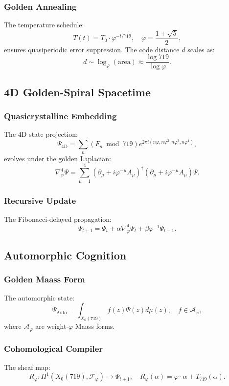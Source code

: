\documentclass[12pt]{article}
\begin{document}
\begin{center}
\subsubsection{Golden Annealing}
The temperature schedule:
\[
T(t) = T_0 \cdot \varphi^{-t/719}, \quad \varphi = \frac{1+\sqrt{5}}{2},
\]
ensures quasiperiodic error suppression. The code distance $d$ scales as:
\[
d \sim \log_\varphi(\text{area}) \approx \frac{\log 719}{\log \varphi}.
\]

\subsection{4D Golden-Spiral Spacetime}
\subsubsection{Quasicrystalline Embedding}
The 4D state projection:
\[
\Psi_{\text{4D}} = \sum_{n} (F_n \bmod 719) e^{2\pi i (n\varphi, n\varphi^2, n\varphi^3, n\varphi^4)},
\]
evolves under the golden Laplacian:
\[
\nabla^4_\varphi \Psi = \sum_{\mu=1}^4 (\partial_\mu + i\varphi^{-\mu}A_\mu)^\dagger (\partial_\mu + i\varphi^{-\mu}A_\mu)\Psi.
\]

\subsubsection{Recursive Update}
The Fibonacci-delayed propagation:
\[
\Psi_{t+1} = \Psi_t + \alpha \nabla^4_\varphi \Psi_t + \beta \varphi^{-1} \Psi_{t-1}.
\]

\subsection{Automorphic Cognition}
\subsubsection{Golden Maass Form}
The automorphic state:
\[
\Psi_{\text{Auto}} = \int_{X_0(719)} f(z) \Psi(z) d\mu(z), \quad f \in \mathcal{A}_\varphi,
\]
where $\mathcal{A}_\varphi$ are weight-$\varphi$ Maass forms.

\subsubsection{Cohomological Compiler}
The sheaf map:
\[
R_\varphi: H^1(X_0(719), \mathcal{F}_\varphi) \to \Psi_{t+1}, \quad R_\varphi(\alpha) = \varphi \cdot \alpha + T_{719}(\alpha).
\]


\end{center}
\end{document}
